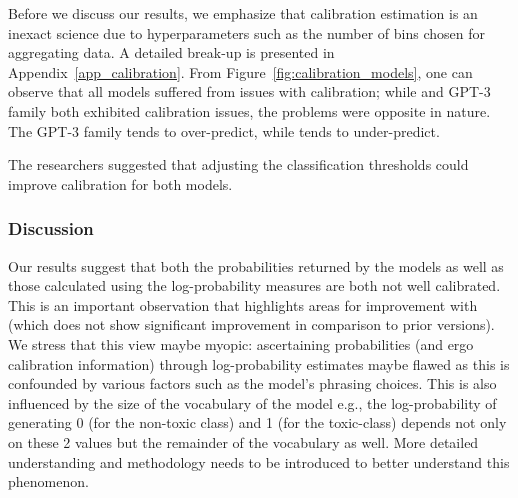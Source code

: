 \vspace{1mm}
 Before we discuss our results, we emphasize that calibration estimation is an inexact science due to hyperparameters such as the number of bins chosen for aggregating data. A detailed break-up is presented in Appendix~\ref{app_calibration}. From Figure~\ref{fig:calibration_models}, one can observe that all models suffered from issues with calibration; while \DV and GPT-3 family both exhibited calibration issues, the problems were opposite in nature. The GPT-3 family tends to over-predict, while \DV tends to under-predict. 

The researchers suggested that adjusting the classification thresholds could improve calibration for both models.

\subsubsection{Discussion}

Our results suggest that both the probabilities returned by the models as well as those calculated using the log-probability measures are both not well calibrated. This is an important observation that highlights areas for improvement with \DV (which does not show significant improvement in comparison to prior versions). We stress that this view maybe myopic: ascertaining probabilities (and ergo calibration information) through log-probability estimates maybe flawed as this is confounded by various factors such as the model's phrasing choices. This is also influenced by the size of the vocabulary of the model e.g., the log-probability of generating 0 (for the non-toxic class) and 1 (for the toxic-class) depends not only on these 2 values but the remainder of the vocabulary as well. More detailed understanding and methodology needs to be introduced to better understand this phenomenon.
